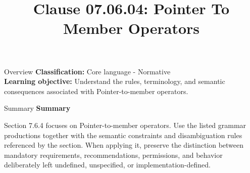 \documentclass[10pt,letterpaper]{article}
\title{Clause 07.06.04: Pointer To Member Operators}
\author{}
\date{}
\begin{document}
\maketitle
\begin{CornellOverviewBox}{Overview}
\textbf{Classification:} Core language - Normative\\[2pt]
\textbf{Learning objective:} Understand the rules, terminology, and semantic consequences associated with Pointer-to-member operators.
\end{CornellOverviewBox}\begin{CornellSummaryBox}{Summary}
{\sffamily\bfseries\color{Accent} Summary}\par\vspace{3pt}Section 7.6.4 focuses on Pointer-to-member operators. Use the listed grammar productions together with the semantic constraints and disambiguation rules referenced by the section. When applying it, preserve the distinction between mandatory requirements, recommendations, permissions, and behavior deliberately left undefined, unspecified, or implementation-defined.
\end{CornellSummaryBox}
\end{document}
